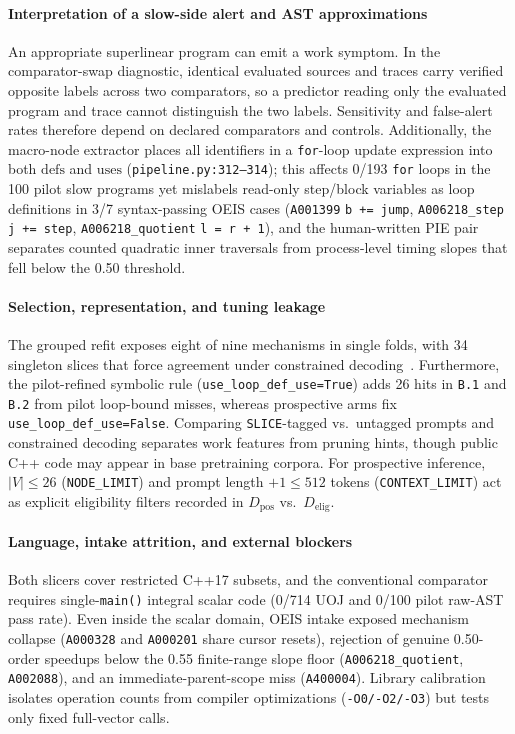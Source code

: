 \documentclass[10pt,journal]{IEEEtran}
\begin{document}
\paragraph{Interpretation of a slow-side alert and AST approximations}
An appropriate superlinear program can emit a work symptom. In the comparator-swap diagnostic, identical evaluated sources and traces carry verified opposite labels across two comparators, so a predictor reading only the evaluated program and trace cannot distinguish the two labels. Sensitivity and false-alert rates therefore depend on declared comparators and controls. Additionally, the macro-node extractor places all identifiers in a \texttt{for}-loop update expression into both $\mathrm{defs}$ and $\mathrm{uses}$ (\texttt{pipeline.py:312--314}); this affects 0/193 \texttt{for} loops in the 100 pilot slow programs yet mislabels read-only step/block variables as loop definitions in 3/7 syntax-passing OEIS cases (\texttt{A001399} \texttt{b += jump}, \texttt{A006218\_step} \texttt{j += step}, \texttt{A006218\_quotient} \texttt{l = r + 1}), and the human-written PIE pair separates counted quadratic inner traversals from process-level timing slopes that fell below the 0.50 threshold.

\paragraph{Selection, representation, and tuning leakage}
The grouped refit exposes eight of nine mechanisms in single folds, with 34 singleton slices that force agreement under constrained decoding~\cite{bates2024cross}. Furthermore, the pilot-refined symbolic rule (\nolinkurl{use_loop_def_use=True}) adds 26 hits in \texttt{B.1} and \texttt{B.2} from pilot loop-bound misses, whereas prospective arms fix \nolinkurl{use_loop_def_use=False}. Comparing \nolinkurl{SLICE}-tagged vs.\ untagged prompts and constrained decoding separates work features from pruning hints, though public C++ code may appear in base pretraining corpora. For prospective inference, $|V| \le 26$ (\texttt{NODE\_LIMIT}) and prompt length $+1 \le 512$ tokens (\texttt{CONTEXT\_LIMIT}) act as explicit eligibility filters recorded in $D_{\mathrm{pos}}$ vs.\ $D_{\mathrm{elig}}$.

\paragraph{Language, intake attrition, and external blockers}
Both slicers cover restricted C++17 subsets, and the conventional comparator requires single-\texttt{main()} integral scalar code (0/714 UOJ and 0/100 pilot raw-AST pass rate). Even inside the scalar domain, OEIS intake exposed mechanism collapse (\texttt{A000328} and \texttt{A000201} share cursor resets), rejection of genuine 0.50-order speedups below the 0.55 finite-range slope floor (\texttt{A006218\_quotient}, \texttt{A002088}), and an immediate-parent-scope miss (\texttt{A400004}). Library calibration isolates operation counts from compiler optimizations (\texttt{-O0/-O2/-O3}) but tests only fixed full-vector calls.
\end{document}
